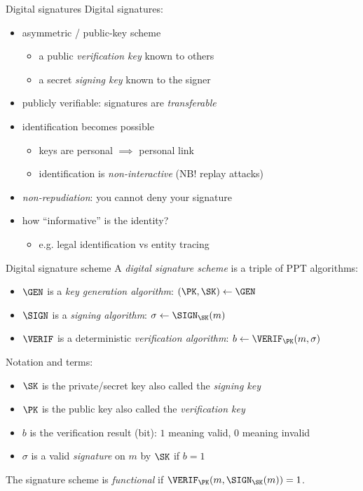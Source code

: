 \begin{frame}{Digital signatures}
  Digital signatures:
  \begin{itemize}[<+(1)->]
    \item asymmetric / public-key scheme
    \begin{itemize}
      \item a public \emph{verification key} known to others
      \item a secret \emph{signing key} known to the signer
    \end{itemize}
    \item publicly verifiable: signatures are \emph{transferable}
    \item identification becomes possible
    \begin{itemize}
      \item keys are personal $\implies$ personal link
      \item identification is \emph{non-interactive} (NB! replay attacks)
    \end{itemize}
    \item \emph{non-repudiation}: you cannot deny your signature
    \item how \enquote{informative} is the identity?
    \begin{itemize}
      \item e.g. legal identification vs entity tracing
    \end{itemize}
  \end{itemize}
\end{frame}

\begin{frame}{Digital signature scheme}
  A \emph{digital signature scheme} is a triple of PPT algorithms:
  \begin{itemize}[<+(1)->]
    \item $\GEN$ is a \emph{key generation algorithm}: $(\PK, \SK)\gets\GEN$
    \item $\SIGN$ is a \emph{signing algorithm}: $\sigma\gets\SIGN_\SK(m)$
    \item $\VERIF$ is a deterministic \emph{verification algorithm}: $b\gets\VERIF_\PK(m, \sigma)$
  \end{itemize}

  \pause
  Notation and terms:
  \begin{itemize}[<+(1)->]
    \item $\SK$ is the private/secret key also called the \emph{signing key}
    \item $\PK$ is the public key also called the \emph{verification key}
    \item $b$ is the verification result (bit): $1$ meaning valid, $0$ meaning invalid
    \item $\sigma$ is a valid \emph{signature} on $m$ by $\SK$ if $b = 1$
  \end{itemize}

  \pause
  The signature scheme is \emph{functional} if $\VERIF_\PK(m, \SIGN_\SK(m)) = 1$.
\end{frame}

